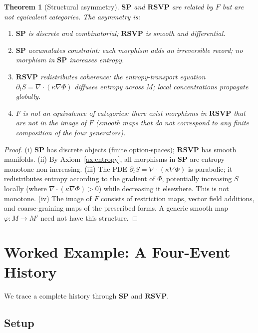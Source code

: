 \documentclass[12pt,a4paper]{article}
\newtheorem{theorem}{Theorem}[section]
\theoremstyle{definition}
\theoremstyle{remark}
\newcommand{\SP}{\mathbf{SP}}
\newcommand{\RSVP}{\mathbf{RSVP}}
\newcommand{\PhiF}{\Phi}
\newcommand{\SF}{S}
\begin{document}
\begin{theorem}[Structural asymmetry]
\label{thm:asymmetry}
$\SP$ and $\RSVP$ are related by $F$ but are not equivalent categories. The asymmetry
is:
\begin{enumerate}[label=(\roman*)]
\item $\SP$ is discrete and combinatorial; $\RSVP$ is smooth and differential.
\item $\SP$ \emph{accumulates constraint}: each morphism adds an irreversible record;
  no morphism in $\SP$ increases entropy.
\item $\RSVP$ \emph{redistributes coherence}: the entropy-transport equation
  $\partial_t\SF=\nabla\cdot(\kappa\nabla\PhiF)$ diffuses entropy across $M$; local
  concentrations propagate globally.
\item $F$ is not an equivalence of categories: there exist morphisms in $\RSVP$ that
  are not in the image of $F$ (smooth maps that do not correspond to any finite
  composition of the four generators).
\end{enumerate}
\end{theorem}

\begin{proof}
(i) $\SP$ has discrete objects (finite option-spaces); $\RSVP$ has smooth manifolds.
(ii) By Axiom~\ref{ax:entropy}, all morphisms in $\SP$ are entropy-monotone non-increasing.
(iii) The PDE $\partial_t\SF=\nabla\cdot(\kappa\nabla\PhiF)$ is parabolic; it
redistributes entropy according to the gradient of $\PhiF$, potentially increasing
$\SF$ locally (where $\nabla\cdot(\kappa\nabla\PhiF)>0$) while decreasing it elsewhere.
This is not monotone. (iv) The image of $F$ consists of restriction maps, vector field
additions, and coarse-graining maps of the prescribed forms. A generic smooth map
$\varphi:M\to M'$ need not have this structure.
\end{proof}

\section{Worked Example: A Four-Event History}
\label{sec:worked}

We trace a complete history through $\SP$ and $\RSVP$.

\subsection{Setup}
\end{document}
